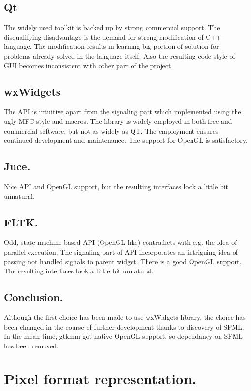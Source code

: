\subsection{Qt}

The widely used toolkit is backed up by strong commercial support. The disqualifying disadvantage is the demand for strong modification of C++ language. The modification results in learning big portion of solution for problems already solved in the language itself. Also the resulting code style of GUI becomes inconsistent with other part of the project.

\subsection{wxWidgets}

The API is intuitive apart from the signaling part which implemented using the ugly MFC style and macros. The library is widely employed in both free and commercial software, but not as widely as QT. The employment ensures continued development and maintenance. The support for OpenGL is satisfactory.

\subsection{Juce.}
Nice API and OpenGL support, but the resulting interfaces look a little bit unnatural.

\subsection{FLTK.}
Odd, state machine based API (OpenGL-like) contradicts with e.g. the idea of parallel execution. The signaling part of API incorporates an intriguing idea of passing not handled signals to parent widget. There is a good OpenGL support. The resulting interfaces look a little bit unnatural.

\subsection{Conclusion.}
Although the first choice has been made to use wxWidgets library, the choice has been changed in the course of further development thanks to discovery of SFML. In the mean time, gtkmm got native OpenGL support, so dependancy on SFML has been removed.

\section{Pixel format representation.}


